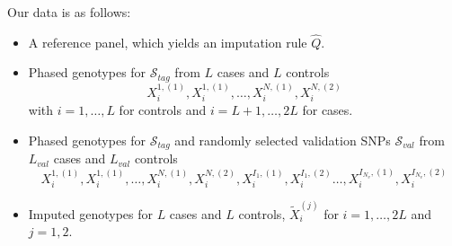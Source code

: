 \documentclass[12pt]{article}
\begin{document}
Our data is as follows:
\begin{itemize}
\item A reference panel, which yields an imputation rule $\hat{Q}$.
\item Phased genotypes for $\mathcal{S}_{tag}$ from $L$ cases and $L$ controls
\[
X_i^{1,(1)},X_i^{1,(1)},\hdots,X_i^{N,(1)},X_i^{N,(2)}
\]
with $i=1,\hdots,L$ for controls and $i=L+1,\hdots,2L$ for cases.
\item Phased genotypes for $\mathcal{S}_{tag}$ and randomly selected
  validation SNPs $\mathcal{S}_{val}$ from $L_{val}$ cases and
  $L_{val}$ controls
\[
X_i^{1,(1)},X_i^{1,(1)},\hdots,X_i^{N,(1)},X_i^{N,(2)},
X_i^{I_1,(1)},X_i^{I_1,(2)}\hdots,X_i^{I_{N_v},(1)},X_i^{I_{N_v},(2)}
\]
\item Imputed genotypes for $L$ cases and $L$ controls,
  $\tilde{X}_i^{(j)}$
for $i = 1,\hdots,2L$ and $j=1,2$.
\end{itemize}
\end{document}
